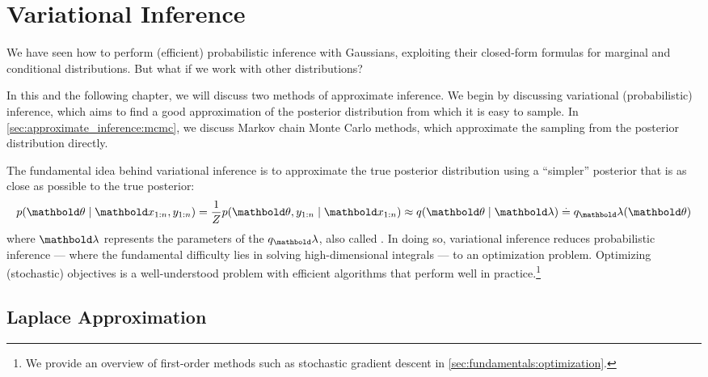\chapter{Variational Inference}\label{sec:approximate_inference}

We have seen how to perform (efficient) probabilistic inference with Gaussians, exploiting their closed-form formulas for marginal and conditional distributions.
But what if we work with other distributions?

In this and the following chapter, we will discuss two methods of approximate inference.
We begin by discussing variational (probabilistic) inference, which aims to find a good approximation of the posterior distribution from which it is easy to sample.
In \cref{sec:approximate_inference:mcmc}, we discuss Markov chain Monte Carlo methods, which approximate the sampling from the posterior distribution directly.

The fundamental idea behind variational inference is to approximate the true posterior distribution using a ``simpler'' posterior that is as close as possible to the true posterior:
\begin{align}
  p(\vtheta \mid \vx_{1:n}, y_{1:n}) = \frac{1}{Z} p(\vtheta, y_{1:n} \mid \vx_{1:n}) \approx q(\vtheta \mid \vlambda) \eqdef q_\vlambda(\vtheta)
\end{align} where $\vlambda$ represents the parameters of the  $q_\vlambda$, also called .
In doing so, variational inference reduces probabilistic inference --- where the fundamental difficulty lies in solving high-dimensional integrals --- to an optimization problem.
Optimizing (stochastic) objectives is a well-understood problem with efficient algorithms that perform well in practice.\footnote{We provide an overview of first-order methods such as stochastic gradient descent in \cref{sec:fundamentals:optimization}.}

\section{Laplace Approximation}\label{sec:approximate_inference:laplace_approximation}

